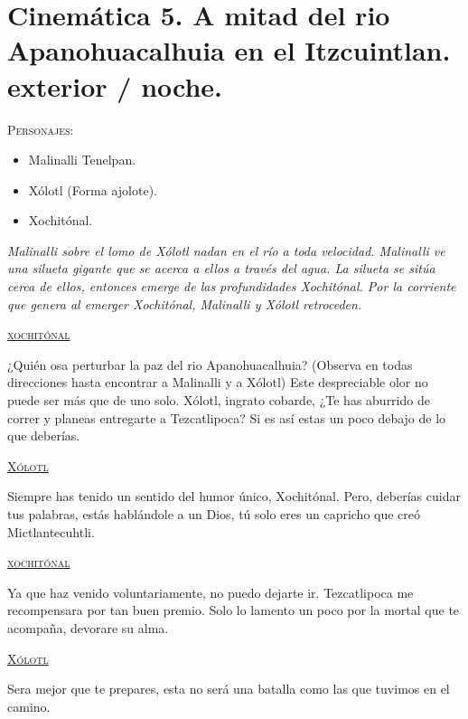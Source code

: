 \section{Cinemática 5. A mitad del rio Apanohuacalhuia en el Itzcuintlan. exterior / noche.} \label{Cin:Cinematica05}
 \textsc{Personajes}:

\begin{itemize}
	\item Malinalli Tenelpan.
	\item Xólotl (Forma ajolote).
	\item Xochitónal.
\end{itemize}

\textit{Malinalli sobre el lomo de Xólotl nadan en el río a toda velocidad. Malinalli ve una silueta gigante que se acerca a ellos a través del agua. La silueta se sitúa cerca de ellos, entonces emerge de las profundidades Xochitónal. Por la corriente que genera al emerger Xochitónal, Malinalli y Xólotl retroceden.}

\begin{center}
\textsc{\underline{xochitónal}}
\\
\par
¿Quién osa perturbar la paz del rio Apanohuacalhuia? (Observa en todas direcciones hasta encontrar a Malinalli y a Xólotl) Este despreciable olor no puede ser más que de uno solo. Xólotl, ingrato cobarde, ¿Te has aburrido de correr y planeas entregarte a Tezcatlipoca? Si es así estas un poco debajo de lo que deberías.
\\
\par
\textsc{\underline{Xólotl}}
\\
\par
Siempre has tenido un sentido del humor único, Xochitónal. Pero, deberías cuidar tus palabras, estás hablándole a un Dios, tú solo eres un capricho que creó Mictlantecuhtli.
\\
\par
\textsc{\underline{xochitónal}}
\\
\par
Ya que haz venido voluntariamente, no puedo dejarte ir. Tezcatlipoca me recompensara por tan buen premio. Solo lo lamento un poco por la mortal que te acompaña, devorare su alma.
\\
\par
\textsc{\underline{Xólotl}}
\\
\par
Sera mejor que te prepares, esta no será una batalla como las que tuvimos en el camino.
\end{center}